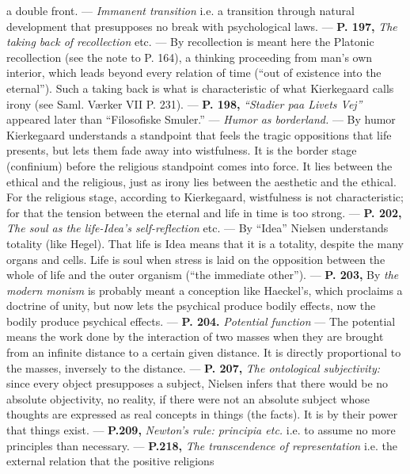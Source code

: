 \documentclass[12pt,a4paper,openany]{book}
\begin{document}
a double front. --- \textit{Immanent transition} i.e. a transition through natural
development that presupposes no break with psychological laws. ---
\textbf{P. 197,} \textit{The taking back of recollection} etc. --- By recollection is meant here
the Platonic recollection (see the note to P. 164), a thinking proceeding from man's own
interior, which leads beyond every relation of time (``out of existence
into the eternal''). Such a taking back is what is characteristic of
what Kierkegaard calls irony (see Saml. Værker VII P. 231). --- \textbf{P. 198,}
\textit{``Stadier paa Livets Vej''} appeared later than ``Filosofiske Smuler.'' ---
\textit{Humor as borderland.} --- By humor Kierkegaard understands a standpoint
that feels the tragic oppositions that life presents, but lets
them fade away into wistfulness. It is the border stage (confinium) before the
religious standpoint comes into force. It lies between the ethical and the
religious, just as irony lies between the aesthetic and the ethical.
For the religious stage, according to Kierkegaard, wistfulness is not characteristic;
for that the tension between the eternal and life in time is too strong. ---
\textbf{P. 202,} \textit{The soul as the life-Idea's self-reflection} etc. --- By ``Idea'' Nielsen
understands totality (like Hegel). That life is Idea means that it is a totality,
despite the many organs and cells. Life is soul when stress
is laid on the opposition between the whole of life and the outer organism
(``the immediate other''). --- \textbf{P. 203,} By \textit{the modern monism} is probably
meant a conception like Haeckel's, which proclaims a doctrine of unity,
but now lets the psychical produce bodily effects,
now the bodily produce psychical effects. --- \textbf{P. 204.}
\textit{Potential function} --- The potential means the work done by the interaction
of two masses when they are brought from an infinite distance to a certain
given distance. It is directly proportional to the masses, inversely to
the distance. --- \textbf{P. 207,} \textit{The ontological subjectivity:} since every object
presupposes a subject, Nielsen infers that there would be no absolute objectivity,
no reality, if there were not an absolute subject whose
thoughts are expressed as real concepts in things (the facts). It
is by their power that things exist. --- \textbf{P.209,} \textit{Newton's rule: principia
etc.} i.e. to assume no more principles than necessary. --- \textbf{P.218,} \textit{The transcendence of representation}
i.e. the external relation that the positive religions
\end{document}
